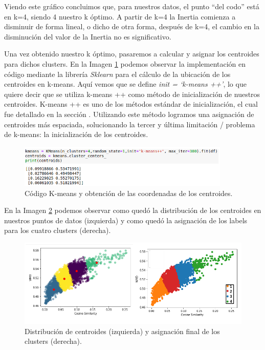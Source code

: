 \documentclass[12pt,a4paper]{article}
\begin{document}
\begin{sloppypar}
Viendo este gráfico concluimos que, para nuestros datos, el punto “del codo” está en k=4, siendo 4 nuestro k óptimo. A partir de k=4 la Inertia comienza a disminuir de forma lineal, o dicho de otra forma, después de k=4, el cambio en la disminución del valor de la Inertia no es significativo. 

\cleardoublepage

Una vez obtenido nuestro k óptimo, pasaremos a calcular y asignar los centroides para dichos clusters. En la Imagen \ref{fig:codigo_k-means} podemos observar la implementación en código mediante la librería \textit{Sklearn} para el cálculo de la ubicación de los centroides en k-means. Aquí vemos que se define \textit{init = ‘k-means ++’}, lo que quiere decir que se utiliza k-means ++ como método de inicialización de nuestros centroides. K-means ++ es uno de los métodos estándar de inicialización, el cual fue detallado en la sección \textit{}. Utilizando este método logramos una asignación de centroides más espaciada, solucionando la tercer y última limitación / problema de k-means: la inicialización de los centroides.

\begin{figure}[H]   
\centering
\includegraphics[width=0.9\textwidth]{images/implementacion_5/codigo_k-means.png}
\captionsetup{justification=centering,margin=3cm}
\caption{Código K-means y obtención de las coordenadas de los centroides.}
\label{fig:codigo_k-means}
\end{figure}

En la Imagen \ref{fig:final_groups} podemos observar como quedó la distribución de los centroides en nuestros puntos de datos (izquierda) y como quedó la asignación de los labels para los cuatro clusters (derecha). 

\begin{figure}[H]   
\centering
\includegraphics[width=1\textwidth]{images/implementacion_5/final_groups.png}
\captionsetup{justification=centering,margin=2cm}
\caption{Distribución de centroides (izquierda) y asignación final de los clusters (derecha).}
\label{fig:final_groups}
\end{figure}


\end{sloppypar}
\end{document}
